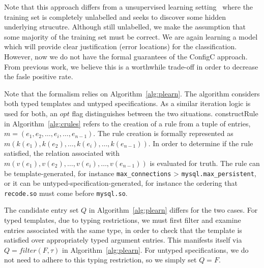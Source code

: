 Note that this approach differs from a unsupervised learning setting~\cite{hastie2009unsupervised} where the training set is completely unlabelled and seeks to discover some hidden underlying strucutre.
Although still unlabelled, we make the assumption that some majority of the training set must be correct.
We are again learning a model which will provide clear justification (error locations) for the classification.
However, now we do not have the formal guarantees of the ConfigC approach.
From previous work, we believe this is a worthwhile trade-off in order to decrease the fasle positive rate.

\iffalse
Note that the formalism relies on Algorithm~\ref{alg:plearn}. The algorithm considers both typed templates and
untyped specifications. As a similar iteration logic is used for both, an $opt$ flag distinguishes between the two situations.
constructRule in Algorithm~\ref{alg:crules} refers to the creation of a rule from a tuple of entries, 
$m = (e_1, e_2, \ldots, e_i, \ldots, e_{n-1})$.
The rule creation is formally represented as $m(k(e_1), k(e_2), \ldots, k(e_i), \ldots, k(e_{n-1}))$. 
In order to determine if the rule satisfied, the relation associated with $m(v(e_1), v(e_2), \ldots, v(e_i), \ldots, v(e_{n-1}))$ is evaluated for truth.
The rule can be template-generated, for instance {\tt max\_connections} > {\tt mysql.max\_persistent}, or
it can be untyped-specification-generated, for instance the ordering that {\tt recode.so} must come before 
{\tt mysql.so}.

The candidate entry set $Q$ in Algorithm~\ref{alg:plearn} 
differs for the two cases.
For typed templates, due to typing restrictions, 
we must first filter and examine entries associated with the same type, in order to check that 
the template is satisfied over appropriately typed argument entries. This manifests itself via $Q = filter(F,\tau)$
in Algorithm~\ref{alg:plearn}. For
untyped specifications, we do not need to adhere to this typing restriction, so we simply set $Q = F$.



